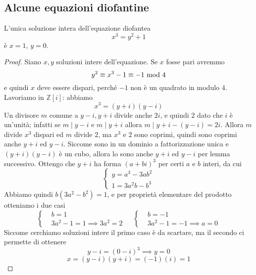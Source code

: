\subsection{Alcune equazioni diofantine}
\begin{teorema}
	L'unica soluzione intera dell'equazione diofantea
	\begin{equation*}
	x^3=y^2+1
	\end{equation*}
	è $x=1$, $y=0$.
\end{teorema}
\begin{proof}
	Siano $x,y$ soluzioni intere dell'equazione. Se $x$ fosse pari avremmo 
	\begin{equation*}
	y^2\equiv x^3-1\equiv -1 \ \mathrm{mod}\ 4
	\end{equation*}
	 e quindi $x$ deve essere dispari, perché $-1$ non è un quadrato in modulo 4. Lavoriamo in $\mathbb{Z}[i]$: abbiamo 
	 \begin{equation*}
	 x^3=(y+i)(y-i)
	 \end{equation*}
	 Un divisore $m$ comune a $y-i, y+i$ divide anche $2i$, e quindi $2$ dato che $i$ è un'unità; infatti se $m \mid y-i$ e $m \mid y+i$ allora $m \mid y+i-(y-i) = 2i$. Allora $m$ divide $x^3$ dispari ed $m$ divide $2$, ma $x^3$ e $2$ sono coprimi, quindi sono coprimi anche $y+i$ ed $y-i$. Siccome sono in un dominio a fattorizzazione unica e $(y+i)(y-i)$ è un cubo, allora lo sono anche $y+i$ ed $y-i$ per lemma successivo. Ottengo che $y+i$ ha forma $(a+bi)^3$ per certi $a$ e $b$ interi, da cui 
	 \begin{equation*}
	 \begin{cases}
	 y=a^3-3ab^2\\1=3a^2b-b^3
	 \end{cases}
	 \end{equation*}
	 Abbiamo quindi $b(3a^2-b^2)=1$, e per proprietà elementare del prodotto otteniamo i due casi
	 \begin{equation*}
	 \begin{cases}
	 &b=1 \\
	 &3a^2-1=1\implies 3a^2=2
	 \end{cases} \ \ \ \ \ 
	 \begin{cases}
	 &b=-1\\
	 &3a^2-1=-1 \implies a=0
	 \end{cases}
	 \end{equation*}
	 Siccome cerchiamo soluzioni intere il primo caso è da scartare, ma il secondo ci permette di ottenere 
	 \begin{equation*}
	 y-i=(0-i)^3\implies y=0
	 \end{equation*}
	 \begin{equation*}
	 x=(y-i)(y+i)=(-1)(i)=1
	 \end{equation*}
\end{proof}
